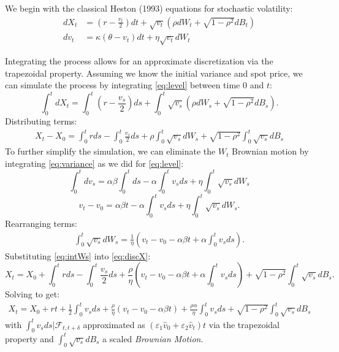 We begin with the classical Heston (1993) equations for stochastic volatility:
\begin{align}
	dX_t &= \left( r - \frac{v_t}{2} \right) dt + \sqrt{v_t} \left( \rho dW_t + \sqrt{1 - \rho^2} dB_t \right) \label{eq:level} \\
	dv_t &= \kappa (\theta - v_t) dt + \eta \sqrt{v_t} dW_t \label{eq:variance}
\end{align}

Integrating the process allows for an approximate discretization via the trapezoidal property. Assuming we know the initial variance and spot price, we can simulate the process by integrating \eqref{eq:level} between time $0$ and $t$:
\[
	\int_{0}^{t} dX_t = \int_{0}^{t} \left( r - \frac{v_s}{2} \right) ds + \int_{0}^{t} \sqrt{v_s} \left( \rho dW_s + \sqrt{1 - \rho^2} dB_s \right) .
\]
Distributing terms:
\begin{align}
	X_t - X_0 = \int_{0}^{t} r ds - \int_{0}^{t} \frac{v_s}{2} ds + \rho \int_{0}^{t} \sqrt{v_s} dW_s + \sqrt{1-\rho^2} \int_{0}^{t} \sqrt{v_s} dB_s \label{eq:discX}
\end{align}
To further simplify the simulation, we can eliminate the $W_t$ Brownian motion by integrating \eqref{eq:variance} as we did for \eqref{eq:level}:
\[
	\int_{0}^{t} dv_s = \alpha \beta \int_{0}^{t} ds - \alpha \int_{0}^{t} v_s ds + \eta \int_{0}^{t} \sqrt{v_s} dW_s
\]
\[
	v_t - v_0 = \alpha \beta t - \alpha \int_{0}^{t} v_s ds + \eta \int_{0}^{t} \sqrt{v_s} dW_s.
\]
Rearranging terms:
\begin{align}
	\int_{0}^{t} \sqrt{v_s} dW_s = \frac{1}{\eta} \left( v_t - v_0 - \alpha \beta t + \alpha \int_{0}^{t} v_s ds \right). \label{eq:intWs}
\end{align}
Substituting \eqref{eq:intWs} into \eqref{eq:discX}:
\[
	X_t = X_0 + \int_{0}^{t} r ds - \int_{0}^{t} \frac{v_s}{2} ds + \frac{\rho}{\eta} \left( v_t - v_0 - \alpha \beta t + \alpha \int_{0}^{t} v_s ds \right) + \sqrt{1-\rho^2} \int_{0}^{t} \sqrt{v_s} dB_s.
\]
Solving to get:
\begin{align}
	X_t = X_0 + r t + \frac{1}{2} \int_{0}^{t} v_s ds  + \frac{\rho}{\eta} \left( v_t - v_0 - \alpha \beta t \right) + \frac{\rho \alpha}{\eta} \int_{0}^{t} v_s ds+ \sqrt{1-\rho^2} \int_{0}^{t} \sqrt{v_s} dB_s
\end{align}
with $\int_{0}^{t} v_s ds | \mathcal{F}_{t,t+\delta} $ approximated as $\left( \varepsilon_1 \hat{v}_0 + \varepsilon_2 \hat{v}_{t} \right)t$ via the trapezoidal property and $\int_{0}^{t} \sqrt{v_s} dB_s$ a scaled \emph{Brownian Motion}.